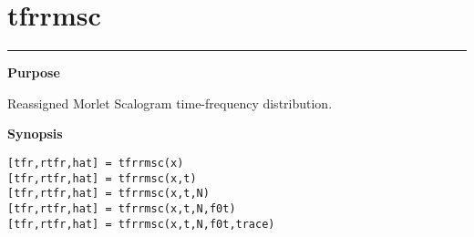 

\section*{\hspace*{-1.6cm} tfrrmsc}

\vspace*{-.4cm}
\hspace*{-1.6cm}\rule[0in]{16.5cm}{.02cm}
\vspace*{.2cm}

{\bf \large \sf Purpose}\\
\hspace*{1.5cm}
\begin{minipage}[t]{13.5cm}
Reassigned Morlet Scalogram time-frequency distribution.
\end{minipage}
\vspace*{.2cm}

{\bf \large \sf Synopsis}\\
\hspace*{1.5cm}
\begin{minipage}[t]{13.5cm}
\begin{verbatim}
[tfr,rtfr,hat] = tfrrmsc(x)
[tfr,rtfr,hat] = tfrrmsc(x,t)
[tfr,rtfr,hat] = tfrrmsc(x,t,N)
[tfr,rtfr,hat] = tfrrmsc(x,t,N,f0t)
[tfr,rtfr,hat] = tfrrmsc(x,t,N,f0t,trace)
\end{verbatim}
\end{minipage}
\vspace*{.5cm}

